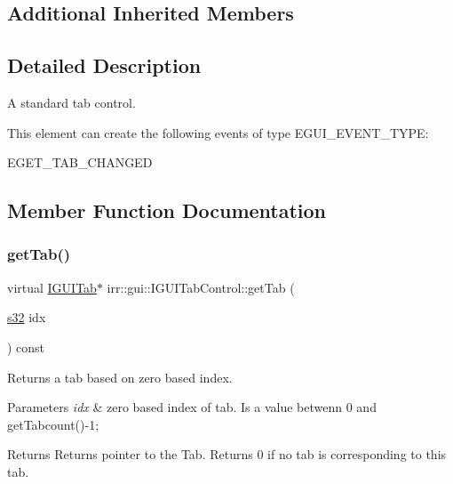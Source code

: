 \subsection*{Additional Inherited Members}


\subsection{Detailed Description}
A standard tab control. 

\begin{DoxyParagraph}{This element can create the following events of type E\+G\+U\+I\+\_\+\+E\+V\+E\+N\+T\+\_\+\+T\+Y\+PE\+:}
\begin{DoxyItemize}
\item E\+G\+E\+T\+\_\+\+T\+A\+B\+\_\+\+C\+H\+A\+N\+G\+ED \end{DoxyItemize}

\end{DoxyParagraph}


\subsection{Member Function Documentation}
\mbox{\label{classirr_1_1gui_1_1IGUITabControl_a1ce91106037c880aae15df77f42aeeda}} 
\subsubsection{\texorpdfstring{get\+Tab()}{getTab()}}
{\footnotesize\ttfamily virtual \hyperlink{classirr_1_1gui_1_1IGUITab}{I\+G\+U\+I\+Tab}$\ast$ irr\+::gui\+::\+I\+G\+U\+I\+Tab\+Control\+::get\+Tab (\begin{DoxyParamCaption}\item[{\hyperlink{namespaceirr_ac66849b7a6ed16e30ebede579f9b47c6}{s32}}]{idx }\end{DoxyParamCaption}) const\hspace{0.3cm}{\ttfamily [pure virtual]}}



Returns a tab based on zero based index. 


\begin{DoxyParams}{Parameters}
{\em idx} & zero based index of tab. Is a value betwenn 0 and get\+Tabcount()-\/1; \\
\hline
\end{DoxyParams}
\begin{DoxyReturn}{Returns}
Returns pointer to the Tab. Returns 0 if no tab is corresponding to this tab. 
\end{DoxyReturn}
\mbox{\label{classirr_1_1gui_1_1IGUITabControl_abe529c6da00af1e156357562eafec031}} 
